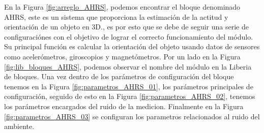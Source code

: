En la Figura \ref{fig:arreglo_AHRS}, podemos encontrar el bloque denominado AHRS, este es un sistema que proporciona la estimación de la actitud y orientación de un objeto en 3D., es por esto que se debe de seguir una serie de configuraciónes con el objetivo de lograr el correcto funcionamiento del módulo. Su principal función es calcular la orientación del objeto usando datos de sensores como acelerómetros, giroscopios y magnetómetros. Por un lado en la Figura \ref{fig:lib_bloques_AHRS}, podemos observar el nombre del módulo en la Liberia de bloques. Una vez dentro de los parámetros de configuración del bloque tenemos en la Figura \ref{fig:parametros_AHRS_01}, los parámetros principales de configuración, seguido de esto en la Figura \ref{fig:parametros_AHRS_02}, tenemos los parámetros encargados del ruido de la medicion. Finalmente en la Figura \ref{fig:parametros_AHRS_03} se configuran los parametros relacionados al ruido del ambiente. 
\newpage

